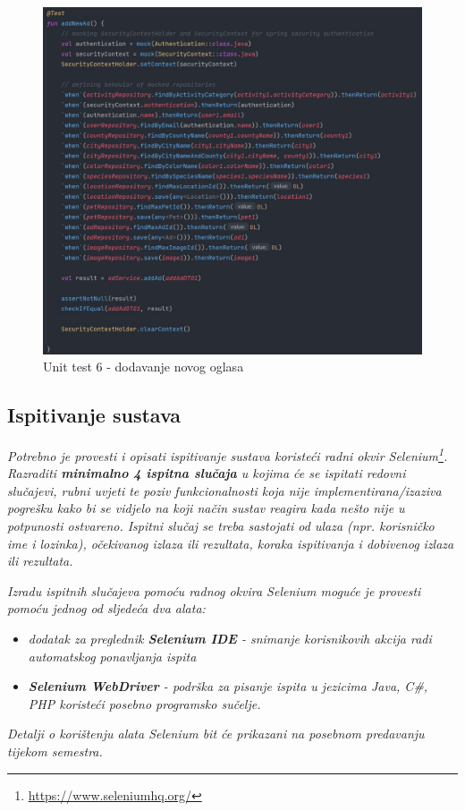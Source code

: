 \begin{figure}[H]
			\includegraphics[scale=0.5]{slike/unit6.PNG} 
			\centering
			\caption{Unit test 6 - dodavanje novog oglasa}
			\label{pawBoost}
		\end{figure}
		
\pagebreak	
			\subsection{Ispitivanje sustava}
			
			 \textit{Potrebno je provesti i opisati ispitivanje sustava koristeći radni okvir Selenium\footnote{\url{https://www.seleniumhq.org/}}. Razraditi \textbf{minimalno 4 ispitna slučaja} u kojima će se ispitati redovni slučajevi, rubni uvjeti te poziv funkcionalnosti koja nije implementirana/izaziva pogrešku kako bi se vidjelo na koji način sustav reagira kada nešto nije u potpunosti ostvareno. Ispitni slučaj se treba sastojati od ulaza (npr. korisničko ime i lozinka), očekivanog izlaza ili rezultata, koraka ispitivanja i dobivenog izlaza ili rezultata.\\ }
			 
			 \textit{Izradu ispitnih slučajeva pomoću radnog okvira Selenium moguće je provesti pomoću jednog od sljedeća dva alata:}
			 \begin{itemize}
			 	\item \textit{dodatak za preglednik \textbf{Selenium IDE} - snimanje korisnikovih akcija radi automatskog ponavljanja ispita	}
			 	\item \textit{\textbf{Selenium WebDriver} - podrška za pisanje ispita u jezicima Java, C\#, PHP koristeći posebno programsko sučelje.}
			 \end{itemize}
		 	\textit{Detalji o korištenju alata Selenium bit će prikazani na posebnom predavanju tijekom semestra.}
			
